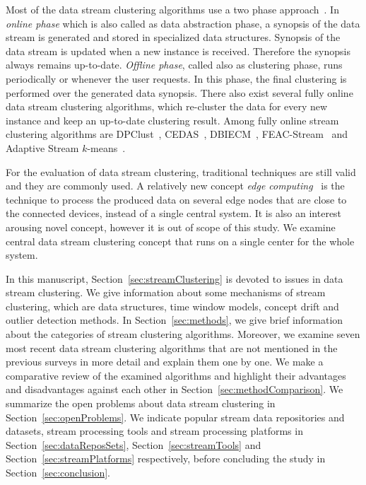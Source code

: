 \documentclass[smallcondensed]{svjour3}     %
\begin{document}
Most of the data stream clustering algorithms use a two phase approach~\citep{Silva:2013survey}.
In \textit{online phase} which is also called as data abstraction phase, a synopsis of the data stream is generated and stored in specialized data structures. Synopsis of the data stream is updated when a new instance is received. Therefore the synopsis always remains up-to-date.
\textit{Offline phase}, called also as clustering phase, runs periodically or whenever the user requests. In this phase, the final clustering is performed over the generated data synopsis.
There also exist several fully online data stream clustering algorithms, which re-cluster the data for every new instance and keep an up-to-date clustering result. Among fully online stream clustering algorithms are DPClust~\citep{DPClust}, CEDAS~\citep{Hyde:2017:Cedas}, DBIECM~\citep{Zhang:2017:dbiecm}, FEAC-Stream~\citep{Silva:2017:FEAC-Stream} and Adaptive Stream $k$-means~\citep{Puschmann:2017:adaptiveStreaming}.

For the evaluation of data stream clustering, traditional techniques are still valid and they are commonly used. 
A relatively new concept \textit{edge computing}~\citep{ShiCao:2016:Edge, ShiDustdar:2016:Edge, Satyanarayanan2017edge} is the technique to process the produced data on several edge nodes that are close to the connected devices, instead of a single central system. It is also an interest arousing novel concept, however it is out of scope of this study. We examine central data stream clustering concept that runs on a single center for the whole system. 

In this manuscript, Section~\ref{sec:streamClustering} is devoted to issues in data stream clustering. We give information about some mechanisms of stream clustering, which are data structures, time window models, concept drift and outlier detection methods. In Section~\ref{sec:methods}, we give brief information about the categories of stream clustering algorithms. Moreover, we examine seven most recent data stream clustering algorithms that are not mentioned in the previous surveys in more detail and explain them one by one. We make a comparative review of the examined algorithms and highlight their advantages and disadvantages against each other in Section~\ref{sec:methodComparison}. We summarize the open problems about data stream clustering in Section~\ref{sec:openProblems}. We indicate popular stream data repositories and datasets, stream processing tools and stream processing platforms in Section~\ref{sec:dataReposSets}, Section~\ref{sec:streamTools} and Section~\ref{sec:streamPlatforms} respectively, before concluding the study in Section~\ref{sec:conclusion}.
\end{document}
